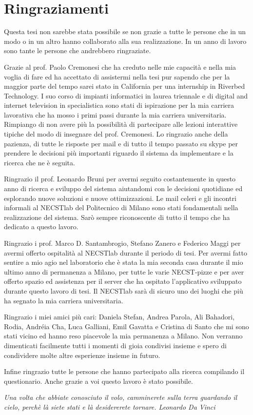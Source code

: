 \chapter*{Ringraziamenti}

Questa tesi non sarebbe stata possibile se non grazie a tutte le persone che in un modo o in un altro hanno collaborato alla sua realizzazione. In un anno di lavoro sono tante le persone che andrebbero ringraziate.

Grazie al prof. Paolo Cremonesi che ha creduto nelle mie capacit\`a e nella mia voglia di fare ed ha accettato di assistermi nella tesi pur sapendo che per la maggior parte del tempo sarei stato in California per una internship in Riverbed Technology. I suo corso di impianti informatici in laurea triennale e di digital and internet television in specialistica sono stati di ispirazione per la mia carriera lavorativa che ha mosso i primi passi durante la mia carriera universitaria. Rimpiango di non avere pi\`u la possibilit\`a di partecipare alle lezioni interattive tipiche del modo di insegnare del prof. Cremonesi. Lo ringrazio anche della pazienza, di tutte le risposte per mail e di tutto il tempo passato su skype per prendere le decisioni pi\`u importanti riguardo il sistema da implementare e la ricerca che ne \`e seguita.

Ringrazio il prof. Leonardo Bruni per avermi seguito costantemente in questo anno di ricerca e sviluppo del sistema aiutandomi con le decisioni quotidiane ed esplorando nuove soluzioni e nuove ottimizzazioni. Le mail celeri e gli incontri informali al NECSTlab del Politecnico di Milano sono stati fondamentali nella realizzazione del sistema. Sar\`o sempre riconoscente di tutto il tempo che ha dedicato a questo lavoro.

Ringrazio i prof. Marco D. Santambrogio, Stefano Zanero e Federico Maggi per avermi offerto ospitalit\`a al NECSTlab durante il periodo di tesi. Per avermi fatto sentire a mio agio nel laboratorio che \`e stata la mia seconda casa durante il mio ultimo anno di permanenza a Milano, per tutte le varie NECST-pizze e per aver offerto spazio ed assistenza per il server che ha ospitato l'applicativo sviluppato durante questo lavoro di tesi. Il NECSTlab sar\`a di sicuro uno dei luoghi che pi\`u ha segnato la mia carriera universitaria.

Ringrazio i miei amici pi\`u cari: Daniela Stefan, Andrea Parola, Ali Bahadori, Rodia, Andr\'eia Cha, Luca Galliani, Emil Gavatta e Cristina di Santo che mi sono stati vicino ed hanno reso piacevole la mia permanenza a Milano. Non verranno dimenticati facilmente tutti i momenti di gioia condivisi insieme e spero di condividere molte altre esperienze insieme in futuro.

Infine ringrazio tutte le persone che hanno partecipato alla ricerca compilando il questionario. Anche grazie a voi questo lavoro \`e stato possibile.

\addvspace{5em}
\begin{flushright}
\textit{Una volta che abbiate conosciuto il volo, camminerete sulla terra guardando il cielo, perch\`e l\`a siete stati e l\`a desidererete tornare. Leonardo Da Vinci}
\end{flushright}